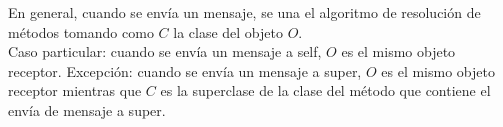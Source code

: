 \documentclass[12pt]{extarticle}
\begin{document}
En general, cuando se envía un mensaje, se una el algoritmo de resolución de métodos tomando como $C$ la clase del objeto $O$. \\
Caso particular: cuando se envía un mensaje a self, $O$ es el mismo objeto receptor.
Excepción: cuando se envía un mensaje a super, $O$ es el mismo objeto receptor mientras que $C$ es la superclase de la clase del método que contiene el envía de mensaje a super.
\end{document}
